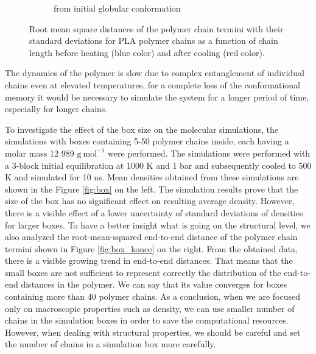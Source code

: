 \begin{figure}[htb!]
\begin{subfigure}{0.5\textwidth}
		\caption{from initial globular conformation}
		\vspace{-0.2cm}
		\label{fig:subim2}
	\end{subfigure}
	\caption{Root mean square distances of the polymer chain termini with their standard deviations  for PLA polymer chains as a function of chain length before heating (blue color) and after cooling (red color).}
	\label{fig:pla_konce}
\end{figure}      

The dynamics of the polymer is slow due to complex entanglement of individual chains even at elevated temperatures, for a complete loss of the conformational memory it would be necessary to simulate the system for a longer period of time, especially for longer chains.

To investigate the effect of the box size on the molecular simulations, the simulations with boxes containing 5-50 polymer chains inside, each having a molar mass 12 989 $\mathrm{g \ mol^{-1}}$ were performed. The simulations were performed with a 3-block initial equilibration at 1000 K and 1 bar and subsequently cooled to 500 K and simulated for 10 ns. Mean densities obtained from these simulations are shown in the Figure \ref{fig:box} on the left. The simulation results prove that the size of the box has no significant effect on resulting average density. However, there is a visible effect of a lower uncertainty of standard deviations of densities for larger boxes. To have a better insight what is going on the structural level, we also analyzed the root-mean-squared end-to-end distance of the polymer chain termini shown in Figure \ref{fig:box_konce} on the right. From the obtained data, there is a visible growing trend in end-to-end distances. That means that the small boxes are not sufficient to represent correctly the distribution of the end-to-end distances in the polymer. We can say that its value converges for boxes containing more than 40 polymer chains. As a conclusion, when we are focused only on macroscopic properties such as density, we can use smaller number of chains in the simulation boxes in order to save the computational resources. However, when dealing with structural properties, we should be careful and set the number of chains in a simulation box more carefully.

